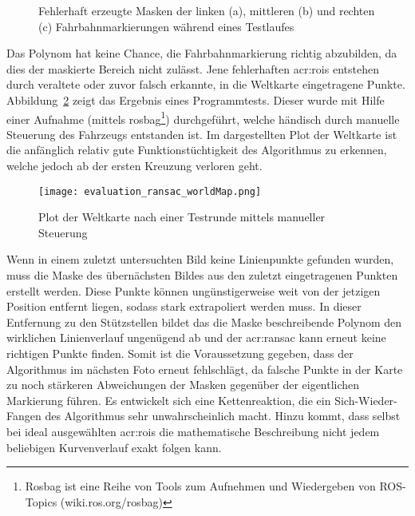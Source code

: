 \begin{figure}[H]
	\centering
	\quad
	\quad
	\caption{Fehlerhaft erzeugte Masken der linken (a), mittleren (b) und rechten (c) Fahrbahnmarkierungen während eines Testlaufes}
	\label{fig:fahrspurerkennung_ransac_ransac}
\end{figure} 

Das Polynom hat keine Chance, die Fahrbahnmarkierung richtig abzubilden, da dies der maskierte Bereich nicht zulässt. Jene fehlerhaften \glspl{acr:roi} entstehen durch veraltete oder zuvor falsch erkannte, in die Weltkarte eingetragene Punkte. Abbildung~\ref{evaluation_ransac_weltkarte} zeigt das Ergebnis eines Programmtests. Dieser wurde mit Hilfe einer Aufnahme (mittels rosbag\footnote{Rosbag ist eine Reihe von Tools zum Aufnehmen und Wiedergeben von ROS-Topics (wiki.ros.org/rosbag)}) durchgeführt, welche händisch durch manuelle Steuerung des Fahrzeugs entstanden ist. Im dargestellten Plot der Weltkarte ist die anfänglich relativ gute Funktionstüchtigkeit des Algorithmus zu erkennen, welche jedoch ab der ersten Kreuzung verloren geht.

\begin{figure}[H] %
	\centering
	\texttt{[image: evaluation\_ransac\_worldMap.png]}
	\caption{Plot der Weltkarte nach einer Testrunde mittels manueller Steuerung}
	\label{evaluation_ransac_weltkarte}
\end{figure} 

Wenn in einem zuletzt untersuchten Bild keine Linienpunkte gefunden wurden, muss die Maske des übernächsten Bildes aus den zuletzt eingetragenen Punkten erstellt werden. Diese Punkte können ungünstigerweise weit von der jetzigen Position entfernt liegen, sodass stark extrapoliert werden muss. In dieser Entfernung zu den Stützstellen bildet das die Maske beschreibende Polynom den wirklichen Linienverlauf ungenügend ab und der \gls{acr:ransac} kann erneut keine richtigen Punkte finden. Somit ist die Voraussetzung gegeben, dass der Algorithmus im nächsten Foto erneut fehlschlägt, da falsche Punkte in der Karte zu noch stärkeren Abweichungen der Masken gegenüber der eigentlichen Markierung führen. Es entwickelt sich eine Kettenreaktion, die ein \glqq Sich-Wieder-Fangen\grqq{} des Algorithmus sehr unwahrscheinlich macht. 
Hinzu kommt, dass selbst bei ideal ausgewählten \glspl{acr:roi} die mathematische Beschreibung nicht jedem beliebigen Kurvenverlauf exakt folgen kann. 


